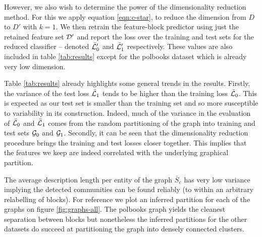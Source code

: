However, we also wish to determine the power of the dimensionality reduction method. For this we apply equation \ref{eqn:c-star}, to reduce the dimension from $D$ to $D'$ with $k=1$. We then retrain the feature-block predictor using just the retained feature set $\mathcal{D}'$ and report the loss over the training and test sets for the reduced classifier -- denoted $\bar{\mathcal{L}}_0'$ and $\bar{\mathcal{L}}_1'$ respectively. These values are also included in table \ref{tab:results} except for the polbooks dataset which is already very low dimension.

\begin{table}[!h]
	\centering
	\caption{Experimental results averaged over $n=10$ iterations (mean $\pm$ standard deviation)}
	\label{tab:results}
\end{table}

Table \ref{tab:results} already highlights some general trends in the results. Firstly, the variance of the test loss $\bar{\mathcal{L}}_1$ tends to be higher than the training loss $\bar{\mathcal{L}}_0$. This is expected as our test set is smaller than the training set and so more susceptible to variability in its construction. Indeed, much of the variance in the evaluation of $\bar{\mathcal{L}}_0$ and $\bar{\mathcal{L}}_1$ comes from the random partitioning of the graph into training and test sets $\mathcal{G}_0$ and $\mathcal{G}_1$. Secondly, it can be seen that the dimensionality reduction procedure brings the training and test losses closer together. This implies that the features we keep are indeed correlated with the underlying graphical partition.

The average description length per entity of the graph $\bar{S}_e$ has very low variance implying the detected communities can be found reliably (to within an arbitrary relabelling of blocks). For reference we plot an inferred partition for each of the graphs on figure \ref{fig:graphs-all}. The polbooks graph yields the cleanest separation between blocks but nonetheless the inferred partitions for the other datasets do succeed at partitioning the graph into densely connected clusters.

